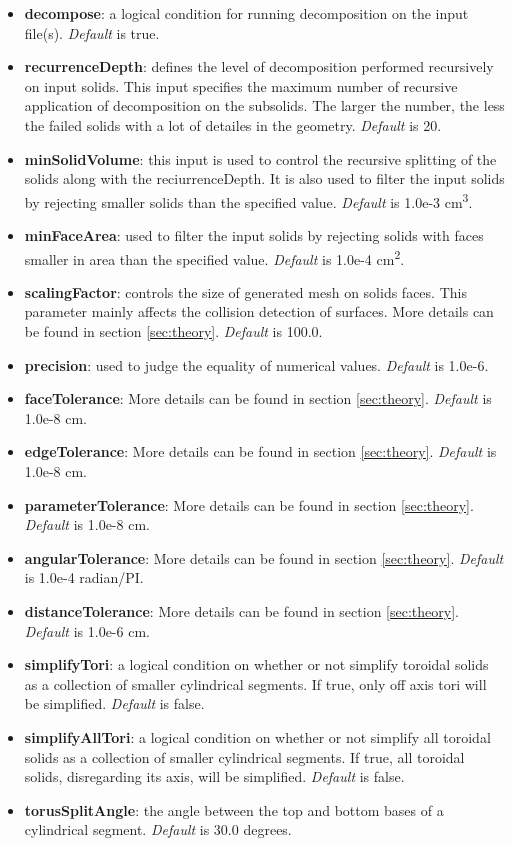 \documentclass[letterpaper, 12 pt]{report}
\begin{document}
	\begin{itemize}
	  \item \textbf{decompose}: a logical condition for running decomposition on the input file(s). \emph{Default} is true.
	  \item \textbf{recurrenceDepth}: defines the level of decomposition performed recursively on input solids. This input specifies the maximum number of recursive application of decomposition on the subsolids. The larger the number, the less the failed solids with a lot of detailes in the geometry. \emph{Default} is 20.
	  \item \textbf{minSolidVolume}: this input is used to control the recursive splitting of the solids along with the reciurrenceDepth. It is also used to filter the input solids by rejecting smaller solids than the specified value. \emph{Default} is 1.0e-3 cm\textsuperscript{3}.
	  \item \textbf{minFaceArea}: used to filter the input solids by rejecting solids with faces smaller in area than the specified value. \emph{Default} is 1.0e-4 cm\textsuperscript{2}.
	  \item \textbf{scalingFactor}: controls the size of generated mesh on solids faces. This parameter mainly affects the collision detection of surfaces. More details can be found in section \ref{sec:theory}. \emph{Default} is 100.0.
	  \item \textbf{precision}: used to judge the equality of numerical values. \emph{Default} is 1.0e-6.
	  \item \textbf{faceTolerance}: More details can be found in section \ref{sec:theory}. \emph{Default} is 1.0e-8 cm.
	  \item \textbf{edgeTolerance}: More details can be found in section \ref{sec:theory}. \emph{Default} is 1.0e-8 cm.
	  \item \textbf{parameterTolerance}: More details can be found in section \ref{sec:theory}. \emph{Default} is 1.0e-8 cm.
	  \item \textbf{angularTolerance}: More details can be found in section \ref{sec:theory}. \emph{Default} is 1.0e-4 radian/PI.
	  \item \textbf{distanceTolerance}: More details can be found in section \ref{sec:theory}. \emph{Default} is 1.0e-6 cm.
	  \item \textbf{simplifyTori}: a logical condition on whether or not simplify toroidal solids as a collection of smaller cylindrical segments. If true, only off axis tori will be simplified. \emph{Default} is false.
	  \item \textbf{simplifyAllTori}: a logical condition on whether or not simplify all toroidal solids as a collection of smaller cylindrical segments. If true, all toroidal solids, disregarding its axis, will be simplified. \emph{Default} is false.
	  \item \textbf{torusSplitAngle}: the angle between the top and bottom bases of a cylindrical segment. \emph{Default} is 30.0 degrees.
    \end{itemize}
\end{document}
